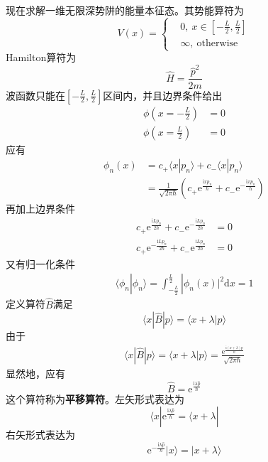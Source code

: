 \documentclass[12pt]{article}
\begin{document}
现在求解一维无限深势阱的能量本征态。其势能算符为
\begin{equation*}
    V(x) = \left \{
        \begin{aligned}
            &0,\ x\in [-\frac L2, \frac L2 ]\\
            &\infty, \ \mathrm{otherwise}
        \end{aligned}
        \right.
\end{equation*}
Hamilton算符为
\begin{equation*}
    \hat{H} = \frac {\hat{p}^2}{2m}
\end{equation*}
波函数只能在$[-\frac L2, \frac L2 ]$区间内，并且边界条件给出
\begin{align*}
    \phi(x = -\frac L2) &= 0\\
    \phi(x = \frac L2) &= 0
\end{align*}
应有
\begin{align*}
    \phi_n(x) &= c_+ \langle x|p_n\rangle + c_- \langle x|p_n\rangle\\
    &= \frac 1{\sqrt{2\pi \hbar}}(c_+\mathrm{e}^{\frac {\mathrm{i}xp_n}{\hbar}}+c_-\mathrm{e}^{-\frac {\mathrm{i}xp_n}{\hbar}})
\end{align*}
再加上边界条件
\begin{align*}
    c_+\mathrm{e}^{\frac {\mathrm{i}Lp_n}{2\hbar}}+c_-\mathrm{e}^{-\frac {\mathrm{i}Lp_n}{2\hbar}} &= 0\\
    c_+\mathrm{e}^{-\frac {\mathrm{i}Lp_n}{2\hbar}}+c_-\mathrm{e}^{\frac {\mathrm{i}Lp_n}{2\hbar}} &= 0
\end{align*}
又有归一化条件
\begin{align*}
    \langle \phi_n | \phi_n \rangle = \int_{-\frac L2}^{\frac L2} |\phi_n(x)|^2 \mathrm{d}x = 1
\end{align*}
定义算符$\hat{B}$满足
\[ \langle x|\hat{B}| p \rangle = \langle x+\lambda |p\rangle \]
由于
\begin{align*}
    \langle x|\hat{B}| p \rangle = \langle x+\lambda |p\rangle = \frac {\mathrm{e}^{\frac {\mathrm{i}(x+\lambda)p}{\hbar}}}{\sqrt{2\pi\hbar}}
\end{align*}
显然地，应有
\begin{equation*}
    \hat{B} = \mathrm{e}^{\frac {\mathrm{i}\lambda \hat{p}}{\hbar}}
\end{equation*}
这个算符称为\textbf{平移算符}。左矢形式表达为
\[ \langle x| \mathrm{e}^{\frac {\mathrm{i}\lambda \hat{p}}{\hbar}} = \langle x+\lambda| \]
右矢形式表达为
\[ \mathrm{e}^{-\frac {\mathrm{i}\lambda \hat{p}}{\hbar}} | x\rangle = |x+\lambda \rangle \]
\end{document}
